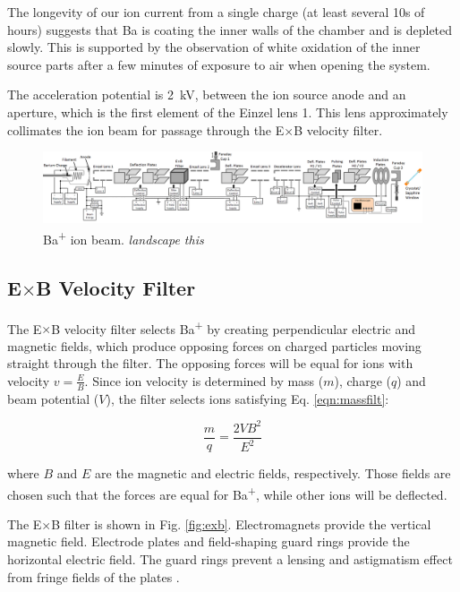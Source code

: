 The longevity of our ion current from a single charge (at least several 10s of hours) suggests that Ba is coating the inner walls of the chamber and is depleted slowly.  This is supported by the observation of white oxidation of the inner source parts after a few minutes of exposure to air when opening the system.

The acceleration potential is 2~kV, between the ion source anode and an aperture, which is the first element of the Einzel lens 1.  This lens approximately collimates the ion beam for passage through the E$\times$B velocity filter.

\begin{figure}[H]
        \centering
                \includegraphics[width=1.\textwidth]{figures/ionBeam.png}
                \caption{Ba\textsuperscript{+} ion beam.  \emph{\color{red}landscape this}}
\label{fig:ionbeam}
\end{figure}

\subsection{E$\times$B Velocity Filter}

The E$\times$B velocity filter selects Ba\textsuperscript{+} by creating perpendicular electric and magnetic fields, which produce opposing forces on charged particles moving straight through the filter.  The opposing forces will be equal for ions with velocity $v = \frac{E}{B}$.  Since ion velocity is determined by mass ($m$), charge ($q$) and beam potential ($V$), the filter selects ions satisfying Eq. \ref{eqn:massfilt}:

\begin{equation}
\frac{m}{q} = \frac{2 V B^{2}}{E^{2}}
\label{eqn:massfilt}
\end{equation}

\noindent
where $B$ and $E$ are the magnetic and electric fields, respectively.  Those fields are chosen such that the forces are equal for Ba\textsuperscript{+}, while other ions will be deflected.  

The E$\times$B filter is shown in Fig. \ref{fig:exb}.  Electromagnets provide the vertical magnetic field.  Electrode plates and field-shaping guard rings provide the horizontal electric field.  The guard rings prevent a lensing and astigmatism effect from fringe fields of the plates \cite{Colutron}.

